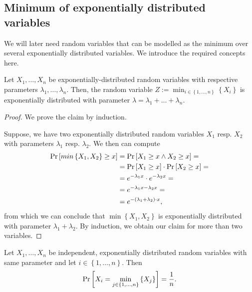 \subsection{Minimum of exponentially distributed variables}
\label{sec:probability-misc}

We will later need random variables that can be modelled as the minimum over several exponentially distributed variables. We introduce the required concepts here.

\begin{theorem}
  \label{thm:minimum-of-exponential-distribution-is-exponential}
  Let $X_1,\dots,X_n$ be exponentially-distributed random variables with respective parameters $\lambda_1,\dots,\lambda_n$. Then, the random variable $Z:=\min_{i\in\left\{ 1,\dots,n \right\}} \left\{ X_i \right\}$ is exponentially distributed with parameter $\lambda=\lambda_1+\dots+\lambda_n$.
\end{theorem}

\begin{proof}
  We prove the claim by induction. 

  Suppose, we have two exponentially distributed random variables $X_1$ resp. $X_2$ with parameters $\lambda_1$ resp. $\lambda_2$. We then can compute
  \begin{align*}
    \operatorname{Pr}\left[min\left\{ X_1,X_2 \right\} \geq x\right] & = \operatorname{Pr}\left[X_1 \geq x \wedge X_2 \geq x\right] = \\ 
    & = \operatorname{Pr}\left[X_1 \geq x\right]\cdot\operatorname{Pr}\left[X_2 \geq x\right] = \\
    & = e^{-\lambda_1 x} \cdot e^{-\lambda_2 x} = \\
    & = e^{-\lambda_1 x - \lambda_2 x} = \\
    & = e^{-\left( \lambda_1+\lambda_2 \right) \cdot x},
  \end{align*}
  from which we can conclude that $\min\left\{ X_1,X_2 \right\}$ is exponentially distributed with parameter $\lambda_1 + \lambda_2$. By induction, we obtain our claim for more than two variables.
\end{proof}

\begin{theorem}
  \label{thm:iid-cont-rand-var-minimum}
  Let $X_1,\dots,X_n$ be independent, exponentially distributed random variables with same parameter and let $i\in\left\{ 1,\dots,n \right\}$. Then 
  \begin{equation}
    \label{eq:probability-that-cont-random-variable-is-smallest-out-of-iid-is-one-over-n}
    \operatorname{Pr}\left[X_i = \min_{j\in\left\{ 1,\dots,n \right\}}\left\{ X_j \right\}\right] = \frac{1}{n}.
  \end{equation}
\end{theorem}

